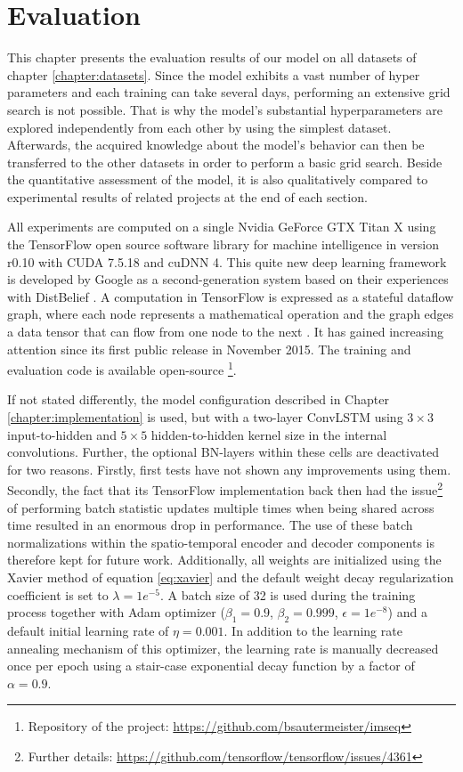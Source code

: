 
\chapter{Evaluation} \label{chapter:evaluation}

This chapter presents the evaluation results of our model on all datasets of chapter \ref{chapter:datasets}. Since the model exhibits a vast number of hyper parameters and each training can take several days, performing an extensive grid search is not possible. That is why the model's substantial hyperparameters are explored independently from each other by using the simplest dataset. Afterwards, the acquired knowledge about the model's behavior can then be transferred to the other datasets in order to perform a basic grid search. Beside the quantitative assessment of the model, it is also qualitatively compared to experimental results of related projects at the end of each section.

All experiments are computed on a single Nvidia GeForce GTX Titan X using the TensorFlow open source software library for machine intelligence in version r0.10 with CUDA 7.5.18 and cuDNN 4. This quite new deep learning framework is developed by Google as a second-generation system based on their experiences with DistBelief \parencite{distbelief}. A computation in TensorFlow is expressed as a stateful dataflow graph, where each node represents a mathematical operation and the graph edges a data tensor that can flow from one node to the next \parencite{tensorflow2015-whitepaper}. It has gained increasing attention since its first public release in November 2015. The training and evaluation code is available open-source \footnote{Repository of the project: \url{https://github.com/bsautermeister/imseq}}.

If not stated differently, the model configuration described in Chapter \ref{chapter:implementation} is used, but with a two-layer ConvLSTM using $3\times3$ input-to-hidden and $5\times5$ hidden-to-hidden kernel size in the internal convolutions. Further, the optional BN-layers within these cells  are deactivated for two reasons. Firstly, first tests have not shown any improvements using them. Secondly, the fact that its TensorFlow implementation back then had the issue\footnote{Further details: \url{https://github.com/tensorflow/tensorflow/issues/4361}} of performing batch statistic updates multiple times when being shared across time resulted in an enormous drop in performance. The use of these batch normalizations within the spatio-temporal encoder and decoder components is therefore kept for future work. Additionally, all weights are initialized using the Xavier method of equation \ref{eq:xavier} and the default weight decay regularization coefficient is set to $\lambda=1e^{-5}$. A batch size of 32 is used during the training process together with Adam optimizer ($\beta_1 = 0.9$, $\beta_2 = 0.999$, $\epsilon =1e^{-8}$) and a default initial learning rate of $\eta = 0.001$. In addition to the learning rate annealing mechanism of this optimizer, the learning rate is manually decreased once per epoch using a stair-case exponential decay function by a factor of $\alpha=0.9$.

